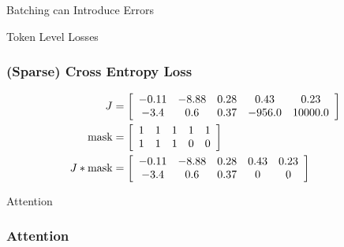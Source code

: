 \documentclass{beamer}
\begin{document}
\begin{section}{Batching can Introduce Errors}
\begin{subsection}{Token Level Losses}
        \begin{frame}
            \frametitle{(Sparse) Cross Entropy Loss}
            \begin{align*}
                J &= \left[ \begin{array}{*5{c}}
                    -0.11 & -8.88 & 0.28 & 0.43 & 0.23 \\
                    -3.4 & 0.6 & 0.37 & -956.0 & 10000.0
                \end{array} \right]\\
                \text{mask} &= \left[ \begin{array}{*5{c}}
                    1 & 1 & 1 & 1 & 1 \\
                    1 & 1 & 1 & 0 & 0
                \end{array} \right] \\
                J * \text{mask} &= \left[ \begin{array}{*5{c}}
                    -0.11 & -8.88 & 0.28 & 0.43 & 0.23 \\
                    -3.4 & 0.6 & 0.37 & 0 & 0
                \end{array} \right]\\
            \end{align*}
        \end{frame}

    \end{subsection} %

    \begin{subsection}{Attention}

        \begin{frame}
            \frametitle{Attention}


\end{frame}
\end{subsection}
\end{section}
\end{document}

